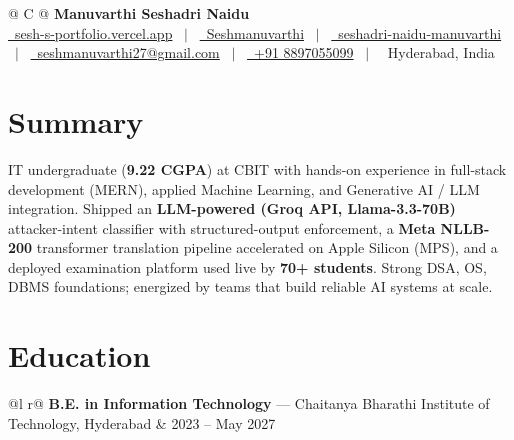 \documentclass[a4paper,10.5pt]{article}
\begin{document}
\pagestyle{empty}

\begin{tabularx}{\linewidth}{@{} C @{}}
{\Huge \textbf{Manuvarthi Seshadri Naidu}} \\[4pt]
\href{https://sesh-s-portfolio.vercel.app}{\raisebox{-0.05\height}\faGlobe\ sesh-s-portfolio.vercel.app} \ $|$ \
\href{https://github.com/Seshmanuvarthi}{\raisebox{-0.05\height}\faGithub\ Seshmanuvarthi} \ $|$ \
\href{https://www.linkedin.com/in/seshadri-naidu-manuvarthi-366466295/}{\raisebox{-0.05\height}\faLinkedin\ seshadri-naidu-manuvarthi} \ $|$ \
\href{mailto:seshmanuvarthi27@gmail.com}{\raisebox{-0.05\height}\faEnvelope\ seshmanuvarthi27@gmail.com} \ $|$ \
\href{tel:+918897055099}{\raisebox{-0.05\height}\faMobile\ +91 8897055099} \ $|$ \
\raisebox{-0.05\height}\faMapMarker\ Hyderabad, India \\
\end{tabularx}

\section{Summary}
\vspace{1pt}
IT undergraduate (\textbf{9.22 CGPA}) at CBIT with hands-on experience in full-stack development (MERN), applied Machine Learning, and Generative AI / LLM integration. Shipped an \textbf{LLM-powered (Groq API, Llama-3.3-70B)} attacker-intent classifier with structured-output enforcement, a \textbf{Meta NLLB-200} transformer translation pipeline accelerated on Apple Silicon (MPS), and a deployed examination platform used live by \textbf{70+ students}. Strong DSA, OS, DBMS foundations; energized by teams that build reliable AI systems at scale.

\section{Education}
\vspace{1pt}
\begin{tabularx}{\linewidth}{@{}l r@{}}
\textbf{B.E. in Information Technology} --- Chaitanya Bharathi Institute of Technology, Hyderabad & \hfill 2023 -- May 2027 \\[2pt]
 \\[2pt]
 \\
\end{tabularx}
\end{document}
